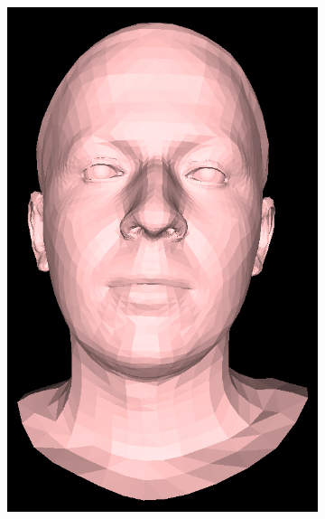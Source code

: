 \documentclass[12pt]{report}
\begin{document}
\begin{figure}[h]
    \centering
    \begin{subfigure}[b]{0.19\textwidth}
        \includegraphics[width=\textwidth]{figures/voca_exp/vocaset_exp1.png}
    \end{subfigure}
    \begin{subfigure}[b]{0.19\textwidth}

\end{subfigure}
\end{figure}
\end{document}
